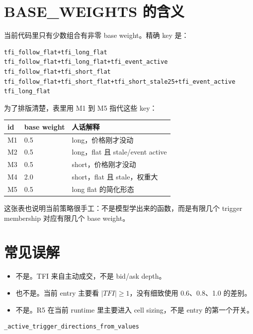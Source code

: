 \section{BASE\_WEIGHTS 的含义}

当前代码里只有少数组合有非零 base weight。精确 key 是：

\begin{lstlisting}
tfi_follow_flat+tfi_long_flat
tfi_follow_flat+tfi_long_flat+tfi_event_active
tfi_follow_flat+tfi_short_flat
tfi_follow_flat+tfi_short_flat+tfi_short_stale25+tfi_event_active
tfi_long_flat
\end{lstlisting}

为了排版清楚，表里用 M1 到 M5 指代这些 key：

\begin{longtable}{p{}p{}p{}}
\toprule
id & base weight & 人话解释 \\
\midrule
M1 & 0.5 & long，价格刚才没动 \\
M2 & 0.5 & long，flat 且 stale/event active \\
M3 & 0.5 & short，价格刚才没动 \\
M4 & 2.0 & short，flat 且 stale，权重大 \\
M5 & 0.5 & long flat 的简化形态 \\
\bottomrule
\end{longtable}

这张表也说明当前策略很手工：不是模型学出来的函数，而是有限几个 trigger membership 对应有限几个 base weight。

\section{常见误解}

\begin{itemize}[leftmargin=2em]
  \item {}不是。TFI 来自主动成交，不是 bid/ask depth。
  \item {}也不是。当前 entry 主要看 \(|TFI|\ge 1\)，没有细致使用 0.6、0.8、1.0 的差别。
  \item {}不是。R5 在当前 runtime 里主要进入 cell sizing，不是 entry 的第一个开关。
\end{itemize}


\begin{lstlisting}
_active_trigger_directions_from_values
\end{lstlisting}
